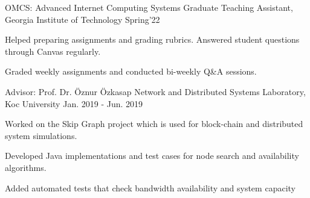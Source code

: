 
\begin{cventries}
   \cvopenentry
    {OMCS: Advanced Internet Computing Systems } %
    {Graduate Teaching Assistant, Georgia Institute of Technology} %
    {}
    {Spring'22} %
    {
      \begin{cvitems} %
        \item {Helped preparing assignments and grading rubrics. Answered student questions through Canvas regularly.}
        \item {Graded weekly assignments and conducted bi-weekly Q\&A sessions.}
      \end{cvitems}
    }

  \cvopenentry
    {Advisor: Prof. Dr. Öznur Özkasap} %
    {Network and Distributed Systems Laboratory, Koc University} %
    {}
    {Jan. 2019 - Jun. 2019} %
    {
      \begin{cvitems} %
        \item {Worked on the Skip Graph project which is used for block-chain and distributed system simulations.}
        \item {Developed Java implementations and test cases for node search and availability algorithms.}
        \item {Added automated tests that check bandwidth availability and system capacity}
      \end{cvitems}
    }


\end{cventries}
